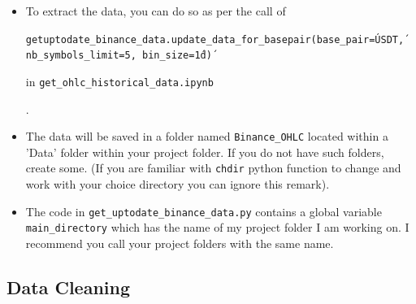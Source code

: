 \documentclass[twoside]{report}
\newcommand{\code}{\texttt}
\begin{document}
\begin{spacing}{1}
\begin{itemize}
\item{To extract the data, you can do so as per the call of \begin{center}\code{getuptodate\_binance\_data.update\_data\_for\_basepair(base\_pair=\'USDT\', nb\_symbols\_limit=5, bin\_size=\'1d\')}\end{center} in \code{get\_ohlc\_historical\_data.ipynb}}.

\item{The data will be saved in a folder named \code{Binance\_OHLC} located within a 'Data' folder within your project folder. If you do not have such folders, create some. (If you are familiar with \code{chdir} python function to change and work with your choice directory you can ignore this remark).}

\item{The code in \code{get\_uptodate\_binance\_data.py} contains a global variable \code{main\_directory} which has the name of my project folder I am working on. I recommend you call your project folders with the same name.}
\end{itemize}


\subsection{Data Cleaning}


\end{spacing}
\end{document}
